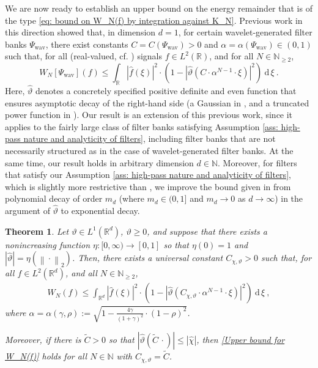 \documentclass[11pt]{amsart}
\newcommand{\R}{{\mathbb{R}}}
\newcommand{\N}{\mathbb{N}}
\newcommand{\dxi}{\:\mathrm{d}\,\xi\:}
\newcommand{\norm}[1]{\ensuremath{\left\lVert\text{}#1\text{}\right\rVert}}
\newtheorem{theorem}{Theorem}[section]
\newenvironment{proof sketch} {\textit{Proof sketch.}}{}
\begin{document}
  We are now ready to establish an upper bound on the energy remainder that is of the type \eqref{eq: bound on W_N(f) by integration against K_N}. Previous work in this direction \cite{waldspurger2017exponential,wiatowski2017energy,wiatowski2017topology} showed that, in dimension $d=1$, for certain wavelet-generated filter banks $\Psi_{\text{wav}}$, there exist constants $C=C(\Psi_{\text{wav}})>0$ and $\alpha=\alpha(\Psi_{\text{wav}}) \in (0,1)$ such that, for all (real-valued, cf. \cite{waldspurger2017exponential}) signals $f \in L^2(\R)$, and for all $N \in \N_{\geq 2}$,
  \[W_N[\Psi_{\text{wav}}](f) \leq \int_{\R} |\widehat{f}(\xi)|^2 \cdot \left(1-\left|\widehat{\vartheta}\left(C \cdot  \alpha^{N-1} \cdot \xi\right)\right|^2\right) \dxi.\]
  Here, $\widehat{\vartheta}$ denotes a concretely specified positive definite and even function that ensures asymptotic decay of the right-hand side (a Gaussian in \cite{waldspurger2017exponential}, and a truncated power function in \cite{wiatowski2017energy}). Our result is an extension of this previous work, since it applies to the fairly large class of filter banks satisfying Assumption \ref{ass: high-pass nature and analyticity of filters}, including filter banks that are not necessarily structured as in the case of wavelet-generated filter banks. 
  At the same time, our result holds in arbitrary dimension $d \in \N$. Moreover, for filters that satisfy our Assumption \ref{ass: high-pass nature and analyticity of filters}, which is slightly more restrictive than \cite[Assumption 1]{wiatowski2017energy}, we improve the bound given in \cite[Theorem 1]{wiatowski2017energy} from polynomial decay of order $m_d$ (where $m_d \in (0,1]$ and $m_d \to 0$ as $d\to \infty$) in the argument of $\widehat{\vartheta}$ to exponential decay. 
  
  \begin{theorem}\label{thm: W_N(f) is upper-bounded by integral}
    Let $\vartheta \in L^1(\R^d)$, $\vartheta \geq 0$, and suppose that there exists a nonincreasing function $\eta:[0,\infty)\to [0,1]$ so that $\eta(0)=1$ and $|\widehat{\vartheta}|=\eta(\norm{\cdot}_2)$.
    Then, there exists a universal constant $C_{\chi,\vartheta}>0$ such that, for all $f \in L^2(\R^d)$, and all $N \in \N_{\geq 2}$,
    \begin{align}\label{Upper bound for W_N(f)}
      W_N(f) \leq \int_{\R^d} |\widehat{f}(\xi)|^2 \cdot \left(1-\left|\widehat{\vartheta}\left(C_{\chi,\vartheta} \cdot  \alpha^{N-1} \cdot \xi\right)\right|^2\right) \dxi,
    \end{align}
    where $\alpha=\alpha(\gamma,\rho):=\sqrt{1-\frac{4\gamma}{(1+\gamma)^2}\cdot (1-\rho)^2}$.
    
    Moreover, if there is $\widetilde{C}>0$ so that $|\widehat{\vartheta}(\widetilde{C}\,\cdot)| \leq |\widehat{\chi}|$, then \eqref{Upper bound for W_N(f)} holds for all $N \in \N$ with $C_{\chi,\vartheta}=\widetilde{C}$.
  \end{theorem}
  
\end{document}
